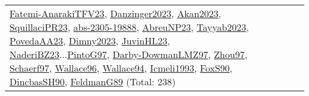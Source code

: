 {\begin{longtable}{p{3cm}r>{\raggedright\arraybackslash}p{6cm}>{\raggedright\arraybackslash}p{6cm}>{\raggedright\arraybackslash}p{8cm}}
\hyperref[detail:Fatemi-AnarakiTFV23]{Fatemi-AnarakiTFV23}, \hyperref[detail:Danzinger2023]{Danzinger2023}, \hyperref[detail:Akan2023]{Akan2023}, \hyperref[detail:SquillaciPR23]{SquillaciPR23}, \hyperref[detail:abs-2305-19888]{abs-2305-19888}, \hyperref[detail:AbreuNP23]{AbreuNP23}, \hyperref[detail:Tayyab2023]{Tayyab2023}, \hyperref[detail:PovedaAA23]{PovedaAA23}, \hyperref[detail:Dimny2023]{Dimny2023}, \hyperref[detail:JuvinHL23]{JuvinHL23}, \hyperref[detail:NaderiBZ23]{NaderiBZ23}...\hyperref[detail:PintoG97]{PintoG97}, \hyperref[detail:Darby-DowmanLMZ97]{Darby-DowmanLMZ97}, \hyperref[detail:Zhou97]{Zhou97}, \hyperref[detail:Schaerf97]{Schaerf97}, \hyperref[detail:Wallace96]{Wallace96}, \hyperref[detail:Wallace94]{Wallace94}, \hyperref[detail:Icmeli1993]{Icmeli1993}, \hyperref[detail:FoxS90]{FoxS90}, \hyperref[detail:DincbasSH90]{DincbasSH90}, \hyperref[detail:FeldmanG89]{FeldmanG89} (Total: 238)\\

\end{longtable}}
